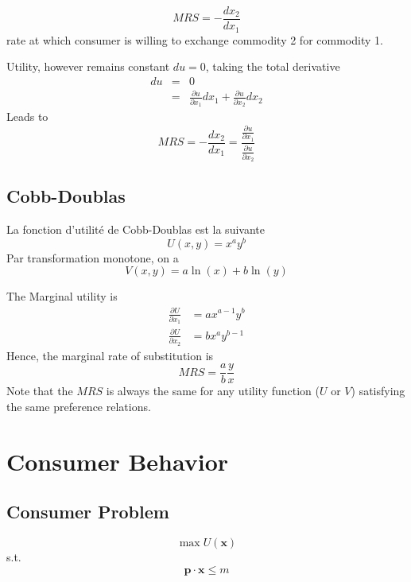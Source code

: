 \documentclass[a4paper] {scrartcl}
\begin{document}
\begin{equation}
	MRS = -\frac{dx_2}{dx_1}
\end{equation}
rate at which consumer is willing to exchange commodity 2 for commodity 1.

Utility, however remains constant $du=0$, taking the total derivative
\begin{eqnarray}
	du &=& 0\nonumber\\
	&=&\frac{\partial u}{\partial x_1}dx_1+\frac{\partial u}{\partial x_2}dx_2
\end{eqnarray}
Leads to
\begin{equation}
	MRS = -\frac{dx_2}{dx_1} = \frac{\frac{\partial u}{\partial x_1}}{\frac{\partial u}{\partial x_2}}
\end{equation}

\subsection{Cobb-Doublas}
La fonction d'utilité de Cobb-Doublas est la suivante
\begin{equation}
	U (x,y) = x^ay^b
\end{equation}
Par transformation monotone, on a
\begin{equation}
	V(x,y) = a\ln{(x)}+ b \ln{(y)}
\end{equation}

The Marginal utility is
\begin{eqnarray}
	\frac{\partial U}{\partial x_1} &= ax^{a-1}y^b\\ 
	\frac{\partial U}{\partial x_2} &= bx^{a}y^{b-1}
\end{eqnarray}
Hence, the marginal rate of substitution is
\begin{equation}
	MRS = \frac{a}{b}\frac{y}{x}
\end{equation}
Note that the $MRS$ is always the same for any utility function ($U$ or $V$) satisfying the same preference relations.

\section{Consumer Behavior}
\subsection{Consumer Problem}
\begin{equation}
	\max U( \mathbf{x})
\end{equation}
s.t.
\begin{equation}
	\mathbf{p}\cdot \mathbf{x}\leq m
\end{equation}
\end{document}
